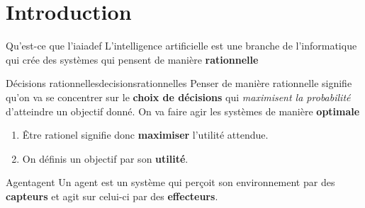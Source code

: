 \documentclass[a4paper, 12pt]{extarticle}
\begin{document}


\makemargins %
\makefrontpage
\maketoc


% 

\section{Introduction} %
\label{sec:introduction}

\begin{definition}{Qu'est-ce que l'ia}{iadef}
    L'intelligence artificielle est une branche de l'informatique qui crée des systèmes 
    qui pensent de manière \textbf{rationnelle}
\end{definition}

\begin{definition}{Décisions rationnelles}{decisionsrationnelles}
    Penser de manière rationnelle signifie qu'on va se concentrer sur le \textbf{choix de décisions}
    qui \textit{maximisent la probabilité} d'atteindre un objectif donné. On va faire agir les systèmes de 
    manière \textbf{optimale}
\end{definition}
\begin{remarks}\leavevmode
\begin{enumerate}
    \item     Être rationel signifie donc \textbf{maximiser} l'utilité attendue.
    \item On définis un objectif par son \textbf{utilité}.
\end{enumerate}
\end{remarks}

\begin{definition}{Agent}{agent}
    Un agent est un système qui perçoit son environnement par des \textbf{capteurs} et agit sur celui-ci par des \textbf{effecteurs}.
\end{definition}
\end{document}
